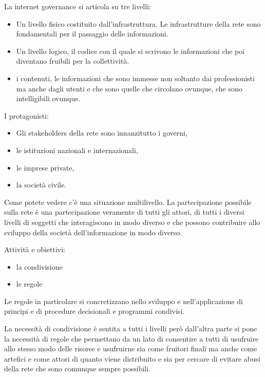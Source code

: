 La internet governance si articola su tre livelli:

\begin{itemize}
    \item Un livello fisico costituito dall'infrastruttura. Le infrastrutture della rete sono fondamentali per il passaggio delle informazioni.
    \item Un livello logico, il codice con il quale si scrivono le informazioni che poi diventano fruibili per la collettività.
    \item i contenuti, le informazioni che sono immesse non soltanto dai professionisti ma anche dagli utenti e che sono quelle che circolano ovunque, che sono intelligibili ovunque.
\end{itemize}

I protagonisti:

\begin{itemize}
    \item Gli stakeholders della rete sono innanzitutto i governi,
    \item le istituzioni nazionali e internazionali,
    \item le imprese private,
    \item la società civile.
\end{itemize}

Come potete vedere c'è una situazione multilivello. La partecipazione possibile sulla rete è una partecipazione veramente di tutti gli attori, di tutti i diversi livelli di soggetti che interagiscono in modo diverso e che possono contribuire allo sviluppo della società dell'informazione in modo diverso.

Attività e obiettivi:

\begin{itemize}
    \item la condivisione
    \item le regole
\end{itemize}

Le regole in particolare si concretizzano nello sviluppo e nell'applicazione di principi e di procedure decisionali e programmi condivisi.

La necessità di condivisione è sentita a tutti i livelli però dall'altra parte si pone la necessità di regole che permettano da un lato di consentire a tutti di usufruire allo stesso modo delle risorse e usufruirne sia come fruitori finali ma anche come artefici e come attori di quanto viene distribuito e sia per cercare di evitare abusi della rete che sono comunque sempre possibili.

